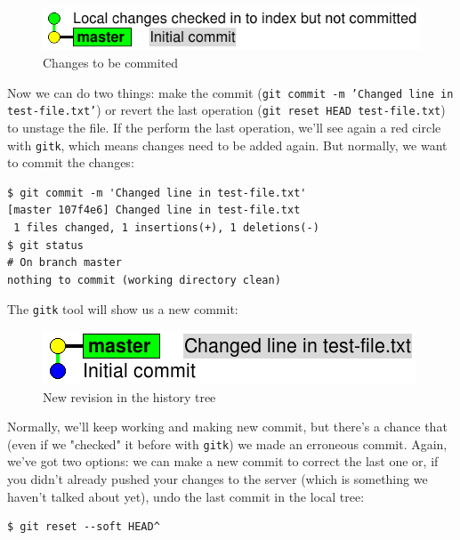 \documentclass[a4paper,10pt]{article}
\newenvironment{terminal}
  {
    \vspace{+10pt}
    \begin{center}
    \begin{minipage}{0.95\textwidth}
    \begin{framed}
  }
  {
    \end{framed}
    \end{minipage}
    \end{center}
    \vspace{+10pt}
  }
\begin{document}
\begin{figure}[h]
  \begin{center}
    \includegraphics[scale=0.5]{git_example-02}
  \end{center}
  \caption{Changes to be commited}
\end{figure}

Now we can do two things: make the commit (\texttt{git commit -m
'Changed line in test-file.txt'}) or revert the last operation
(\texttt{git reset HEAD test-file.txt}) to unstage the file. If the
perform the last operation, we'll see again a red circle with
\texttt{gitk}, which means changes need to be added again. But normally,
we want to commit the changes:

\begin{terminal}
\begin{verbatim}
$ git commit -m 'Changed line in test-file.txt'
[master 107f4e6] Changed line in test-file.txt
 1 files changed, 1 insertions(+), 1 deletions(-)
$ git status
# On branch master
nothing to commit (working directory clean)
\end{verbatim}%
\end{terminal}

The \texttt{gitk} tool will show us a new commit:

\begin{figure}[h]
  \begin{center}
    \includegraphics[scale=0.5]{git_example-03}
  \end{center}
  \caption{New revision in the history tree}
\end{figure}

Normally, we'll keep working and making new commit, but there's a
chance that (even if we "checked" it before with \texttt{gitk}) we
made an erroneous commit. Again, we've got two options: we can make
a new commit to correct the last one or, if you didn't already pushed
your changes to the server (which is something we haven't talked about
yet), undo the last commit in the local tree:

\begin{terminal}
\begin{verbatim}
$ git reset --soft HEAD^
\end{verbatim}%
\end{terminal}
\end{document}
